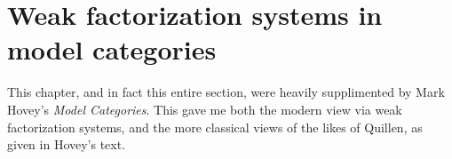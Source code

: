 \chapter{Weak factorization systems in model categories}

This chapter, and in fact this entire section, were heavily supplimented by Mark Hovey's \emph{Model Categories}. This gave me both the modern view via weak factorization systems, and the more classical views of the likes of Quillen, as given in Hovey's text. 
